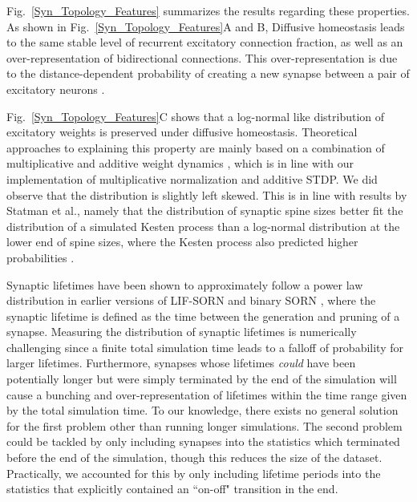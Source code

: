 \documentclass[10pt,letterpaper]{article}
\begin{document}
Fig.~\ref{Syn_Topology_Features} summarizes the results regarding these properties. As shown in Fig.~\ref{Syn_Topology_Features}A and B, Diffusive homeostasis leads to the same stable level of recurrent excitatory connection fraction, as well as an over-representation of bidirectional connections. This over-representation is due to the distance-dependent probability of creating a new synapse between a pair of excitatory neurons \cite{SORN_Paper,Hoffmann_2017}.

Fig.~\ref{Syn_Topology_Features}C shows that a log-normal like distribution of excitatory weights is preserved under diffusive homeostasis. 
Theoretical approaches to explaining this property are mainly based on a combination of multiplicative and additive weight dynamics \cite{Loewenstein_Spine_Sizes,Pengsheng_2013,Statman_Synapses_2014,Loewenstein_2015}, which is in line with our implementation of multiplicative normalization and additive STDP. We did observe that the distribution is slightly left skewed. This is in line with results by Statman et al., namely that the distribution of synaptic spine sizes better fit the distribution of a simulated Kesten process than a log-normal distribution at the lower end of spine sizes, where the Kesten process also predicted higher probabilities \cite{Statman_Synapses_2014}. 

Synaptic lifetimes have been shown to approximately follow a power law distribution in earlier versions of LIF-SORN and binary SORN \cite{SORN_Paper,Pengsheng_2013}, where the synaptic lifetime is defined as the time between the generation and pruning of a synapse. Measuring the distribution of synaptic lifetimes is numerically challenging since a finite total simulation time leads to a falloff of probability for larger lifetimes. Furthermore, synapses whose lifetimes \emph{could} have been potentially longer but were simply terminated by the end of the simulation will cause a bunching and over-representation of lifetimes within the time range given by the total simulation time. To our knowledge, there exists no general solution for the first problem other than running longer simulations. The second problem could be tackled by only including synapses into the statistics which terminated before the end of the simulation, though this reduces the size of the dataset. Practically, we accounted for this by only including lifetime periods into the statistics that explicitly contained an ``on-off" transition in the end.
\end{document}
